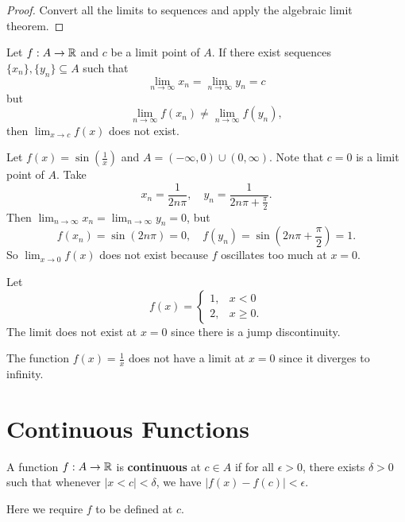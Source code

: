 \begin{proof}
  Convert all the limits to sequences and apply the algebraic
  limit theorem.
\end{proof}

\begin{corollary}
  Let $f : A \to \mathbb{R}$ and $c$ be a limit point of $A$. If there
  exist sequences $\{x_n\}, \{y_n\} \subseteq A$ such that
  \[\lim_{n \to \infty} x_n = \lim_{n \to \infty} y_n = c\]
  but
  \[\lim_{n \to \infty} f(x_n) \ne \lim_{n \to \infty} f(y_n),\]
  then $\lim_{x \to c} f(x)$ does not exist.
\end{corollary}

\begin{example}
  Let $f(x) = \sin(\frac{1}{x})$ and
  $A = (-\infty, 0) \cup (0, \infty)$.
  Note that $c = 0$ is a limit point of $A$. Take
  \[x_n = \frac{1}{2n \pi}, \quad y_n = \frac{1}{2n\pi + \frac{\pi}{2}}.\]
  Then $\lim_{n \to \infty} x_n = \lim_{n \to \infty} y_n = 0$,
  but
  \[
  f(x_n) = \sin(2n \pi) = 0, \quad f(y_n) = \sin(2n \pi + \frac{\pi}{2}) = 1
  .\]
  So $\lim_{x \to 0} f(x)$ does not exist because $f$ oscillates
  too much at $x = 0$.
\end{example}

\begin{example}
  Let
  \[
    f(x) = \begin{cases}
      1, &  x < 0 \\
      2, &  x \ge 0.
    \end{cases}
  \]
  The limit does not exist at $x = 0$ since there is a jump
  discontinuity.
\end{example}

\begin{example}
  The function $f(x) = \frac{1}{x}$ does not have a limit at
  $x = 0$ since it diverges to infinity.
\end{example}

\section{Continuous Functions}
\begin{definition}
  A function $f : A \to \mathbb{R}$ is \textbf{continuous} at $c \in A$
  if for all $\epsilon > 0$, there exists $\delta > 0$ such that
  whenever $|x < c| < \delta$, we have
  $|f(x) - f(c)| < \epsilon$.
\end{definition}

\begin{remark}
  Here we require $f$ to be defined at $c$.
\end{remark}

